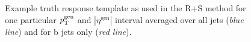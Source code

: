 \begin{figure}[!t]
  \centering
  \caption{Example truth response template as used in the R+S method for one particular $p_{\text{T}}^\mathrm{gen}$ and $|\eta^\mathrm{gen}|$ interval averaged over all jets (\textit{blue line}) and for b jets only (\textit{red line}).}
  \label{fig:RPlusS_response}
\end{figure}

